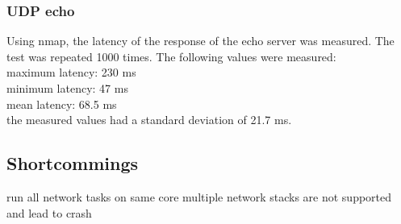 \subsubsection{UDP echo}
Using nmap, the latency of the response of the echo server was measured. The test was repeated 1000 times. The following values were measured:\\
maximum latency: 230 ms\\
minimum latency: 47 ms\\
mean latency: 68.5 ms\\
the measured values had a standard deviation of 21.7 ms.

\subsection{Shortcommings}
run all network tasks on same core
multiple network stacks are not supported and lead to crash

